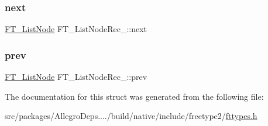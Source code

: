 \subsubsection{\texorpdfstring{next}{next}}
{\footnotesize\ttfamily \hyperlink{fttypes_8h_a155e4980a42c16fbc221ad40b2b59695}{F\+T\+\_\+\+List\+Node} F\+T\+\_\+\+List\+Node\+Rec\+\_\+\+::next}

\mbox{\label{struct_f_t___list_node_rec___a41c77950e6940b1b98e04709b705c046}} 
\subsubsection{\texorpdfstring{prev}{prev}}
{\footnotesize\ttfamily \hyperlink{fttypes_8h_a155e4980a42c16fbc221ad40b2b59695}{F\+T\+\_\+\+List\+Node} F\+T\+\_\+\+List\+Node\+Rec\+\_\+\+::prev}



The documentation for this struct was generated from the following file\+:\begin{DoxyCompactItemize}
\item 
src/packages/\+Allegro\+Deps..../build/native/include/freetype2/\hyperlink{fttypes_8h}{fttypes.\+h}\end{DoxyCompactItemize}
